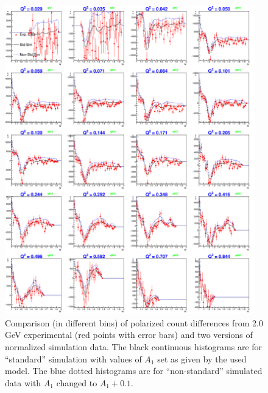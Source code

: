 \begin{figure}[H] %
  \leavevmode \includegraphics[width=0.97\textwidth]{figuresEG4/FigAnal/xsDiff_StdD79_nStdD80C71S181Eb8Wbins70NZmd.png}
  \caption[Count differences (2.0 GeV)]{Comparison (in different \qsqs bins) of polarized count differences from 2.0 GeV experimental (red points with error bars) and two versions of normalized simulation data. The black continuous histograms are for ``standard'' simulation with values of $A_1$ set as given by the used model. The blue dotted histograms are for ``non-standard'' simulated data with $A_1$ changed to $A_1 + 0.1$. }
  \label{xsComp8}  %
\end{figure}



